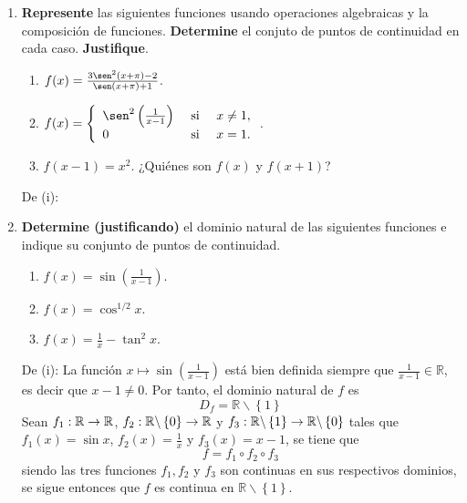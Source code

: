 \documentclass[12pt]{article}
\begin{document}
\begin{enumerate}
    \item \textbf{Represente} las siguientes funciones usando operaciones algebraicas y la composición de funciones. \textbf{Determine} el conjuto de puntos de continuidad en cada caso. \textbf{Justifique}.
    \begin{enumerate}
        \item $f(x)=\frac{3\sen^2(x+\pi)-2}{\sen(x+\pi)+1}$.
        \item $f(x)=\left\{
            \begin{array}{lcr}
                \sen^2\left(\frac{1}{x-1} \right) & \textup{ si } & x\neq 1,\\
                0 & \textup{ si } & x = 1.\\
            \end{array}
        \right.$.
        \item $f(x-1)=x^2$. ¿Quiénes son $f(x)$ y $f(x+1)$?
    \end{enumerate}
    
    \begin{sol}
        De (i): %
    \end{sol}

    \item  \textbf{Determine (justificando)} el dominio natural de las siguientes funciones e indique su conjunto de puntos de continuidad.
    \begin{enumerate}
        \item $f(x)=\sin\left(\frac{1}{x-1}\right)$.
        \item $f(x)=\cos^{1/2}x$.
        \item $f(x)=\frac{1}{x}-\tan^2x$.
    \end{enumerate}

    \begin{sol}
        De (i): La función $x\mapsto\sin\left(\frac{1}{x-1} \right)$ está bien definida siempre que $\frac{1}{x-1}\in\mathbb{R}$, es decir que $x-1\neq0$. Por tanto, el dominio natural de $f$ es
        \begin{equation*}
            D_f=\mathbb{R}\backslash\left\{1 \right\}
        \end{equation*}
        Sean $f_1:\mathbb{R}\rightarrow\mathbb{R}$, $f_2:\mathbb{R}\backslash\left\{0\right\}\rightarrow\mathbb{R}$ y $f_3:\mathbb{R}\backslash\left\{1\right\}\rightarrow\mathbb{R}\backslash\left\{0\right\}$ tales que $f_1(x)=\sin x$, $f_2(x)=\frac{1}{x}$ y $f_3(x)=x-1$, se tiene que
        \begin{equation*}
            f=f_1\circ f_2\circ f_3
        \end{equation*}
        siendo las tres funciones $f_1,f_2$ y $f_3$ son continuas en sus respectivos dominios, se sigue entonces que $f$ es continua en $\mathbb{R}\backslash\left\{ 1\right\}$.


\end{sol}
\end{enumerate}
\end{document}
